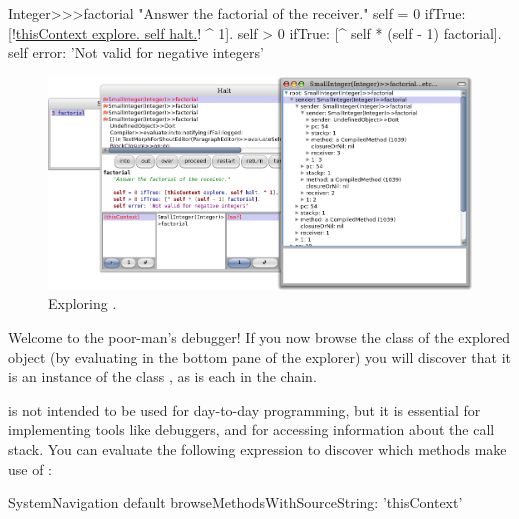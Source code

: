 \documentclass[a4paper,10pt,twoside]{book}
\begin{document}
{
\begin{code}{}
Integer>>>factorial
	"Answer the factorial of the receiver."
	self = 0 ifTrue: [!\underline{thisContext explore. self halt.}! ^ 1].
	self > 0 ifTrue: [^ self * (self - 1) factorial].
	self error: 'Not valid for negative integers'
\end{code}


\begin{figure}[ht]\centering
	\includegraphics[width=\linewidth]{exploringThisContext}
	\caption{Exploring .}
\end{figure}

Welcome to the poor-man's debugger!
If you now browse the class of the explored object (\ie by evaluating  in the bottom pane of the explorer) you will discover that it is an instance of the class , as is each  in the chain.

 is not intended to be used for day-to-day programming, but it is essential for implementing tools like debuggers, and for accessing information about the call stack.
You can evaluate the following expression to discover which methods make use of :

\begin{code}{}
SystemNavigation default browseMethodsWithSourceString: 'thisContext'
\end{code}

}
\end{document}
